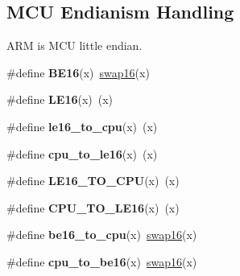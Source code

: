 \subsection*{M\+C\+U Endianism Handling}
\label{_amgrpc36c0117ea92446a6a59adb04c50c165}%
 A\+R\+M is M\+C\+U little endian. \begin{DoxyCompactItemize}
\item 
\hypertarget{group__group__sam0__utils_ga34c0ccbaef341c224a18eb4dcaf44407}{}\#define {\bfseries B\+E16}(x)~\hyperlink{group__group__sam0__utils_ga3067f71c33a89726a107430050253045}{swap16}(x)\label{group__group__sam0__utils_ga34c0ccbaef341c224a18eb4dcaf44407}

\item 
\hypertarget{group__group__sam0__utils_ga54d648861a1120a3f8d6255e9cf54125}{}\#define {\bfseries L\+E16}(x)~(x)\label{group__group__sam0__utils_ga54d648861a1120a3f8d6255e9cf54125}

\item 
\hypertarget{group__group__sam0__utils_ga65e9510f535c1ee2f826d447471289fa}{}\#define {\bfseries le16\+\_\+to\+\_\+cpu}(x)~(x)\label{group__group__sam0__utils_ga65e9510f535c1ee2f826d447471289fa}

\item 
\hypertarget{group__group__sam0__utils_gaeda3065f344779edb9023e22d84d5f92}{}\#define {\bfseries cpu\+\_\+to\+\_\+le16}(x)~(x)\label{group__group__sam0__utils_gaeda3065f344779edb9023e22d84d5f92}

\item 
\hypertarget{group__group__sam0__utils_gaa0da5576d76569d3a7452897a91ea0e6}{}\#define {\bfseries L\+E16\+\_\+\+T\+O\+\_\+\+C\+P\+U}(x)~(x)\label{group__group__sam0__utils_gaa0da5576d76569d3a7452897a91ea0e6}

\item 
\hypertarget{group__group__sam0__utils_gaa3d310efe7cd6126823b8721852d7e56}{}\#define {\bfseries C\+P\+U\+\_\+\+T\+O\+\_\+\+L\+E16}(x)~(x)\label{group__group__sam0__utils_gaa3d310efe7cd6126823b8721852d7e56}

\item 
\hypertarget{group__group__sam0__utils_ga48f33ad7b3de0010e5c802ced48f8a7b}{}\#define {\bfseries be16\+\_\+to\+\_\+cpu}(x)~\hyperlink{group__group__sam0__utils_ga3067f71c33a89726a107430050253045}{swap16}(x)\label{group__group__sam0__utils_ga48f33ad7b3de0010e5c802ced48f8a7b}

\item 
\hypertarget{group__group__sam0__utils_gaf42a6506135fe9e671c40973bacc849f}{}\#define {\bfseries cpu\+\_\+to\+\_\+be16}(x)~\hyperlink{group__group__sam0__utils_ga3067f71c33a89726a107430050253045}{swap16}(x)\label{group__group__sam0__utils_gaf42a6506135fe9e671c40973bacc849f}


\end{DoxyCompactItemize}
